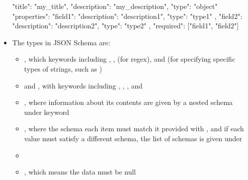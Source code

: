 \documentclass[a4paper]{article}
\begin{document}
\begin{itemize}
    \begin{json}
{
    "title": "my_title",
    "description": "my_description",
    "type": "object"
    "properties": {
        "field1": {
            "description": "description1",
            "type": "type1"
        },
        "field2": {
            "description": "description2",
            "type": "type2"
        }
    },
    "required": ["field1", "field2"]
}
\end{json}
\item The types in JSON Schema are:
\begin{itemize}
    \item {}, which keywords including , ,  (for regex), and  (for specifying specific types of strings, such as )
    \item {} and , with keywords including , , , and 
    \item {}, where information about its contents are given by a nested schema under keyword 
    \item {}, where the schema each item must match it provided with , and if each value must satisfy a different schema, the list of schemas is given under 
    \item {}
    \item {}, which means the data must be null
\end{itemize}
\end{itemize}
\end{document}
